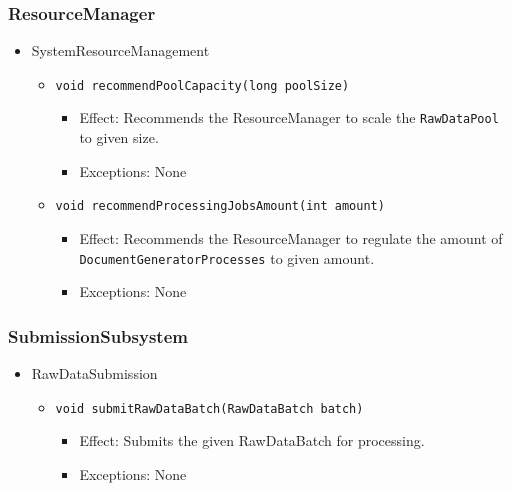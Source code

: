 \documentclass[a4paper,10pt]{article}
\begin{document}
\subsubsection*{ResourceManager}
\begin{itemize}
    \item SystemResourceManagement
    \begin{itemize}
        \item \texttt{void recommendPoolCapacity(long poolSize)}
        \begin{itemize}
            \item Effect: Recommends the ResourceManager to scale the \texttt{Raw\-Data\-Pool} to given size.
            \item Exceptions: None
        \end{itemize}

        \item \texttt{void recommendProcessingJobsAmount(int amount)}
        \begin{itemize}
            \item Effect: Recommends the ResourceManager to regulate the amount of \texttt{DocumentGeneratorProcesses} to given amount.
            \item Exceptions: None
         \end{itemize}
    \end{itemize}
\end{itemize}

\subsubsection*{SubmissionSubsystem}
\begin{itemize}
	\item RawDataSubmission
	\begin{itemize}
		\item \texttt{void submitRawDataBatch(RawDataBatch batch)}
		\begin{itemize}
			\item Effect: Submits the given RawDataBatch for processing.
			\item Exceptions: None
		\end{itemize}
	\end{itemize}
\end{itemize}
\end{document}

